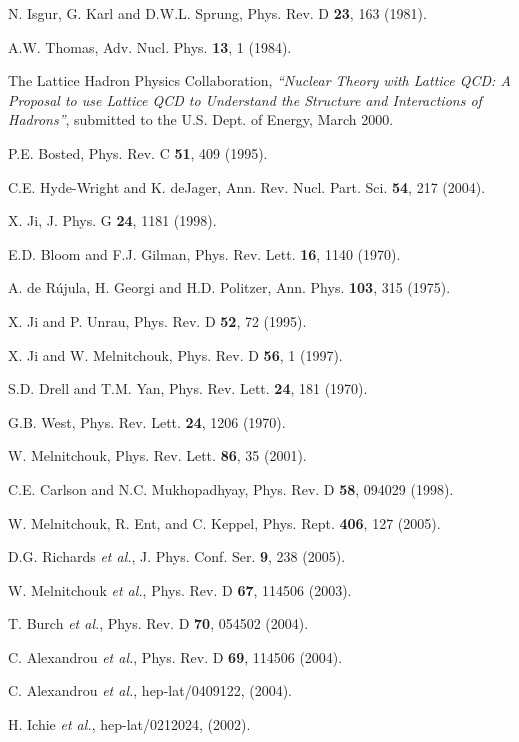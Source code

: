 \begin{thebibliography}{199}
N. Isgur, G. Karl and D.W.L. Sprung, Phys. Rev. D {\bf 23}, 163 (1981).

A.W. Thomas, Adv. Nucl. Phys. {\bf 13}, 1 (1984).

The Lattice Hadron Physics Collaboration, {\it ``Nuclear Theory with 
Lattice QCD: A Proposal to use Lattice QCD to Understand the Structure 
and Interactions of Hadrons''}, submitted to the U.S. Dept. of Energy, 
March 2000.

P.E. Bosted, Phys. Rev. C {\bf 51}, 409 (1995).

C.E. Hyde-Wright and K. deJager, Ann. Rev. Nucl. Part. Sci. {\bf 54},
217 (2004).

X. Ji, J. Phys. G {\bf 24}, 1181 (1998).

E.D. Bloom and F.J. Gilman, Phys. Rev. Lett. {\bf 16}, 1140 (1970).

A. de R\'ujula, H. Georgi and H.D. Politzer, Ann. Phys. {\bf 103}, 315
(1975).

X. Ji and P. Unrau, Phys. Rev. D {\bf 52}, 72 (1995).

X. Ji and W. Melnitchouk, Phys. Rev. D {\bf 56}, 1 (1997).

S.D. Drell and T.M. Yan, Phys. Rev. Lett. {\bf 24}, 181 (1970).

G.B. West, Phys. Rev. Lett. {\bf 24}, 1206 (1970).

W. Melnitchouk, Phys. Rev. Lett. {\bf 86}, 35 (2001).

C.E. Carlson and N.C. Mukhopadhyay, Phys. Rev. D {\bf 58}, 094029 (1998).

W. Melnitchouk, R. Ent, and C. Keppel, Phys. Rept. {\bf 406}, 127 (2005).

D.G. Richards {\it et al.}, J. Phys. Conf. Ser. {\bf 9}, 238 (2005).

W. Melnitchouk {\it et al.}, Phys. Rev. D {\bf 67}, 114506 (2003).

T. Burch {\it et al.}, Phys. Rev. D {\bf 70}, 054502 (2004).

C. Alexandrou {\it et al.}, Phys. Rev. D {\bf 69}, 114506 (2004).

C. Alexandrou {\it et al.}, hep-lat/0409122, (2004).

H. Ichie {\it et al.}, hep-lat/0212024, (2002).


\end{thebibliography}
